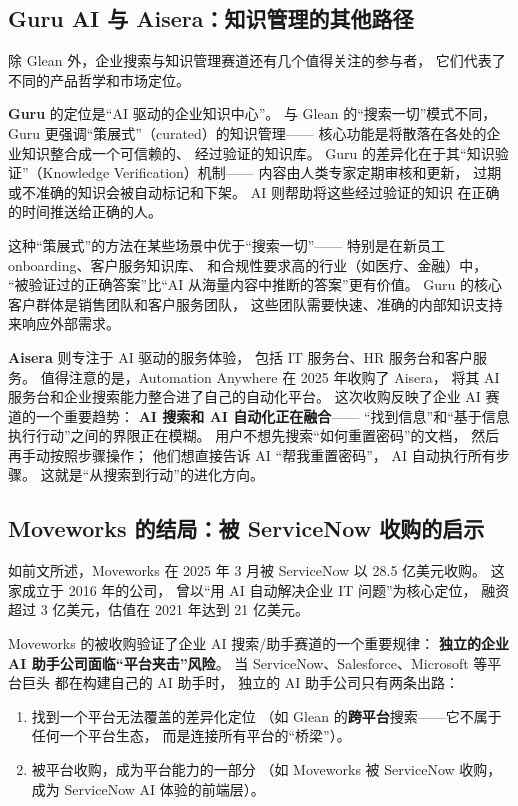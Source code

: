 \subsection{Guru AI 与 Aisera：知识管理的其他路径}

除 Glean 外，企业搜索与知识管理赛道还有几个值得关注的参与者，
它们代表了不同的产品哲学和市场定位。

\textbf{Guru} 的定位是``AI 驱动的企业知识中心''。
与 Glean 的``搜索一切''模式不同，
Guru 更强调``策展式''（curated）的知识管理——
核心功能是将散落在各处的企业知识整合成一个可信赖的、
经过验证的知识库。
Guru 的差异化在于其``知识验证''（Knowledge Verification）机制——
内容由人类专家定期审核和更新，
过期或不准确的知识会被自动标记和下架。
AI 则帮助将这些经过验证的知识
在正确的时间推送给正确的人。

这种``策展式''的方法在某些场景中优于``搜索一切''——
特别是在新员工 onboarding、客户服务知识库、
和合规性要求高的行业（如医疗、金融）中，
``被验证过的正确答案''比``AI 从海量内容中推断的答案''更有价值。
Guru 的核心客户群体是销售团队和客户服务团队，
这些团队需要快速、准确的内部知识支持来响应外部需求。

\textbf{Aisera} 则专注于 AI 驱动的服务体验，
包括 IT 服务台、HR 服务台和客户服务。
值得注意的是，Automation Anywhere 在 2025 年收购了 Aisera，
将其 AI 服务台和企业搜索能力整合进了自己的自动化平台。
这次收购反映了企业 AI 赛道的一个重要趋势：
\textbf{AI 搜索和 AI 自动化正在融合}——
``找到信息''和``基于信息执行行动''之间的界限正在模糊。
用户不想先搜索``如何重置密码''的文档，
然后再手动按照步骤操作；
他们想直接告诉 AI ``帮我重置密码''，
AI 自动执行所有步骤。
这就是``从搜索到行动''的进化方向。

\subsection{Moveworks 的结局：被 ServiceNow 收购的启示}

如前文所述，Moveworks 在 2025 年 3 月被 ServiceNow 以 28.5 亿美元收购。
这家成立于 2016 年的公司，
曾以``用 AI 自动解决企业 IT 问题''为核心定位，
融资超过 3 亿美元，估值在 2021 年达到 21 亿美元。

Moveworks 的被收购验证了企业 AI 搜索/助手赛道的一个重要规律：
\textbf{独立的企业 AI 助手公司面临``平台夹击''风险}。
当 ServiceNow、Salesforce、Microsoft 等平台巨头
都在构建自己的 AI 助手时，
独立的 AI 助手公司只有两条出路：

\begin{enumerate}[noitemsep]
  \item 找到一个平台无法覆盖的差异化定位
        （如 Glean 的\textbf{跨平台}搜索——它不属于任何一个平台生态，
        而是连接所有平台的``桥梁''）。
  \item 被平台收购，成为平台能力的一部分
        （如 Moveworks 被 ServiceNow 收购，
        成为 ServiceNow AI 体验的前端层）。
\end{enumerate}

